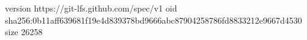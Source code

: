 version https://git-lfs.github.com/spec/v1
oid sha256:0b11aff639681f19e4d839378bd9666abc87904258786fd8833212e9667d4530
size 26258
